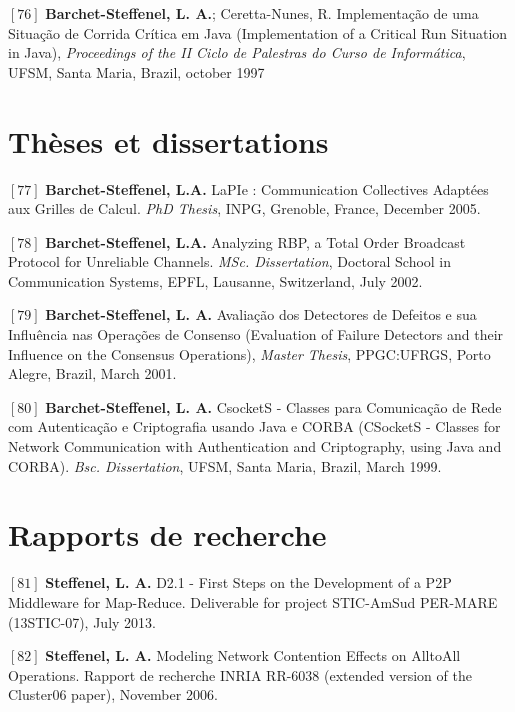 \documentclass[final,twoside]{hdr} %
\begin{document}
\vspace{1em} \noindent $[76]$
\textbf{Barchet-Steffenel, L. A.}; Ceretta-Nunes, R. {Implementação de uma Situação de Corrida Crítica em Java} (Implementation of a Critical Run Situation in Java), {\em Proceedings of the II Ciclo de Palestras do Curso de Informática}, UFSM, Santa Maria, Brazil, october 1997

\section*{Thèses et dissertations}

\noindent $[77]$
\textbf{Barchet-Steffenel, L.A.} {LaPIe : Communication Collectives Adaptées aux Grilles de Calcul}. {\em PhD Thesis}, INPG, Grenoble, France, December 2005. 

\vspace{1em} \noindent $[78]$
\textbf{Barchet-Steffenel, L.A.} {Analyzing RBP, a Total Order Broadcast Protocol for Unreliable Channels}. {\em MSc. Dissertation}, Doctoral School in Communication Systems, EPFL, Lausanne, Switzerland, July 2002.

\vspace{1em} \noindent $[79]$
\textbf{Barchet-Steffenel, L. A.} {Avaliação dos Detectores de Defeitos e sua Influência nas Operações de Consenso} (Evaluation of Failure Detectors and their Influence on the Consensus Operations), {\em Master Thesis}, PPGC:UFRGS, Porto Alegre, Brazil, March 2001.

\vspace{1em} \noindent $[80]$
\textbf{Barchet-Steffenel, L. A.} {CsocketS - Classes para Comunicação de Rede com Autenticação e Criptografia usando Java e CORBA} (CSocketS - Classes for Network Communication with Authentication and Criptography, using Java and CORBA). {\em Bsc. Dissertation}, UFSM, Santa Maria, Brazil, March 1999.


\section*{Rapports de recherche}

 \noindent $[81]$
\textbf{Steffenel, L. A.} {D2.1 - First Steps on the Development of a P2P Middleware for Map-Reduce}. Deliverable for project STIC-AmSud PER-MARE (13STIC-07), July 2013. 

\vspace{1em} \noindent $[82]$
\textbf{Steffenel, L. A.} {Modeling Network Contention Effects on AlltoAll Operations}. Rapport de recherche INRIA RR-6038 (extended version of the Cluster06 paper), November 2006. 
\end{document}
